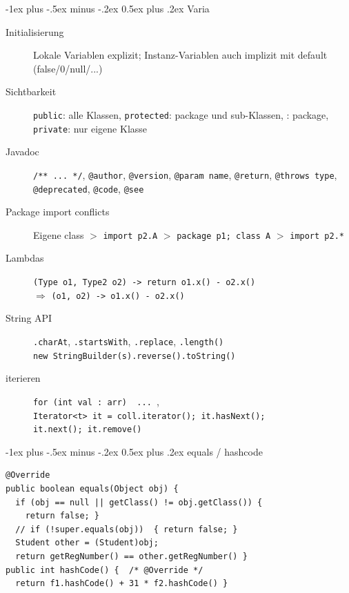 \documentclass[10pt,landscape,a4paper]{article}
\makeatletter
\renewcommand{\section}{\@startsection{section}{1}{0mm}%
                                {-1ex plus -.5ex minus -.2ex}%
                                {0.5ex plus .2ex}%
                                {\normalfont\large\bfseries}}
\newcommand{\java}[1]{\texttt{#1}}
\makeatother
\begin{document}
\footnotesize
\begin{multicols*}{3}


\setlength{\premulticols}{1pt}
\setlength{\postmulticols}{1pt}
\setlength{\multicolsep}{1pt}
\setlength{\columnsep}{2pt}


\section{Varia}

\begin{description}
\item[Initialisierung] Lokale Variablen explizit; Instanz-Variablen auch
  implizit mit default (false/0/null/...)
\item[Sichtbarkeit] \java{public}: alle Klassen, \java{protected}: package und
  sub-Klassen, \textvisiblespace: package, \java{private}: nur eigene Klasse
\item[Javadoc] \java{/** ... */}, \java{@author}, \java{@version}, \java{@param name}, \java{@return}, \java{@throws type}, \java{@deprecated}, \java{{@code}}, \java{@see}
\item[Package import conflicts] Eigene class $>$ \java{import p2.A} $>$ \java{package p1; class A} $>$ \java{import p2.*}
\item[Lambdas] \java{(Type o1, Type2 o2) -> {return o1.x() - o2.x()}} \\
  $\Rightarrow$ \java{(o1, o2) -> o1.x() - o2.x()}
\item[String API] \java{.charAt}, \java{.startsWith}, \java{.replace}, \java{.length()} \\ \java{new StringBuilder(s).reverse().toString()}
\item[iterieren] \java{for (int val : arr) { ... }}, \\ \java{Iterator<t> it = coll.iterator(); it.hasNext();} \\ \java{it.next(); it.remove()}
\end{description}

\section{equals / hashcode}

\begin{verbatim}
@Override
public boolean equals(Object obj) {
  if (obj == null || getClass() != obj.getClass()) {
    return false; }
  // if (!super.equals(obj))  { return false; }
  Student other = (Student)obj;
  return getRegNumber() == other.getRegNumber() }
public int hashCode() {  /* @Override */
  return f1.hashCode() + 31 * f2.hashCode() }
\end{verbatim}


\end{multicols*}
\end{document}
